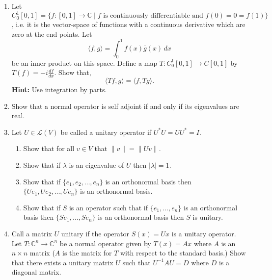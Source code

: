 \documentclass[12pt,letterpaper]{article}
\theoremstyle{plain}
\theoremstyle{definition}
\begin{document}
\begin{enumerate}[1.]
\item Let $C_0^1[0,1]=\{f:[0,1]\rightarrow \mathbb{C} \mid f\text{ is continuously differentiable and } f(0)=0=f(1)\}$, i.e. it is the vector-space of functions with a continuous derivative which are zero at the end points. Let 
\[\langle f, g\rangle =\int_{0}^1f(x)\bar{g}(x)\, dx\]
be an inner-product on this space. Define a map $T: C_0^1[0,1]\rightarrow C[0,1]$ by $T(f)=-i\frac{df}{dx}$. 
Show that, 
\[\langle Tf, g\rangle =\langle f, Tg\rangle.\]
{\bf Hint: }Use integration by parts.

\item Show that a normal operator is self adjoint if and only if its eigenvalues are real. 

\item Let $U\in \mathcal{L}(V)$ be called a unitary operator if $U^*U=UU^*=I$. 
\begin{enumerate}
\item Show that for all $v\in V$ that $\|v\|=\|Uv\|$. 
\item Show that if $\lambda$ is an eigenvalue of $U$ then $|\lambda|=1$. 
\item Show that if $\{e_1, e_2, \ldots, e_n\}$ is an orthonormal basis then $\{Ue_1, Ue_2, \ldots, Ue_n\}$ is an orthonormal basis.
\item Show that if  $S$ is an operator such that if $\{e_1,\ldots, e_n\}$ is an orthonormal basis then $\{Se_1, \ldots, Se_n\}$ is an orthonormal basis then $S$ is unitary.
\end{enumerate}

\item Call a matrix $U$ unitary if the operator $S(x)=Ux$ is a unitary operator. Let $T:\mathbb{C}^n\rightarrow \mathbb{C}^n$ be a normal operator given by $T(x)=Ax$ where $A$ is an $n\times n$ matrix ($A$ is the matrix for $T$ with respect to the standard basis.) Show that there exists a unitary matrix $U$ such that $U^{-1}AU=D$ where $D$ is a diagonal matrix. 

\end{enumerate}
\end{document}
